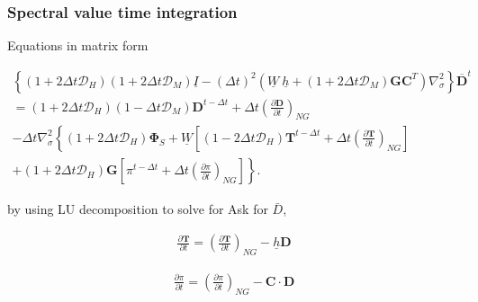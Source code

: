 \hypertarget{spectral-value-time-integration}{%
\subsubsection{Spectral value time
integration}\label{spectral-value-time-integration}}

Equations in matrix form

\begin{eqnarray}
      \left\{ ( 1+2\Delta t {\mathcal D}_H )( 1+2\Delta t {\mathcal D}_M )
           \underline{I}  
      - ( \Delta t )^{2}  ( \underline{W} \ \underline{h}
           + (1+2\Delta t {\mathcal D}_M)
             \mathbf{G} \mathbf{C}^{T} ) \nabla^{2}_{\sigma}
  \right\}
      \overline{ \mathbf{D} }^{t}
       \\
  = ( 1+2\Delta t {\mathcal D}_H )( 1-\Delta t {\mathcal D}_M )
       \mathbf{D}^{t-\Delta t}
  + \Delta t
         \left( \frac{\partial \mathbf{D}}{\partial t} \right)_{NG}  
  \\
  -  \Delta t \nabla^{2}_{\sigma}     
                   \left\{  ( 1+2\Delta t {\mathcal D}_H ) \mathbf{\Phi}_{S}
                          + \underline{W}
                            \left[ ( 1-2\Delta t {\mathcal D}_H )
                                    \mathbf{T}^{t-\Delta t}
                                  + \Delta t
                                      \left( \frac{\partial \mathbf{T}}
                                                  {\partial t}     
                                      \right)_{NG} \right]
                   \right.
  \\
                 \left.  
                          + ( 1+2\Delta t {\mathcal D}_H ) \mathbf{G}
                            \left[ \pi^{t-\Delta t}
                                  + \Delta t
                                     \left( \frac{\partial \pi}
                                                 {\partial t}
                                     \right)_{NG}  \right]
                   \right\} .
\end{eqnarray}

by using LU decomposition to solve for Ask for \(\bar{D}\),

\begin{eqnarray}
  \frac{\partial \mathbf{T}}{\partial t}
      =   \left( \frac{\partial \mathbf{T}}
                        {\partial t}       \right)_{NG}  
         - \underline{h} \mathbf{D}
\end{eqnarray}

\begin{eqnarray}
  \frac{\partial \pi}{\partial t}
      =   \left( \frac{\partial \pi}
                        {\partial t}       \right)_{NG}  
         - \mathbf{C} \cdot \mathbf{D}
\end{eqnarray}

